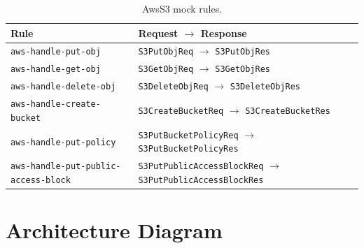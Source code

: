 \documentclass[11pt]{article}
\begin{document}
\begin{table}[H]
\centering
\small
\begin{tabular}{@{}ll@{}}
\toprule
\textbf{Rule} & \textbf{Request $\to$ Response} \\
\midrule
\texttt{aws-handle-put-obj}                & \texttt{S3PutObjReq} $\to$ \texttt{S3PutObjRes} \\
\texttt{aws-handle-get-obj}                & \texttt{S3GetObjReq} $\to$ \texttt{S3GetObjRes} \\
\texttt{aws-handle-delete-obj}             & \texttt{S3DeleteObjReq} $\to$ \texttt{S3DeleteObjRes} \\
\texttt{aws-handle-create-bucket}          & \texttt{S3CreateBucketReq} $\to$ \texttt{S3CreateBucketRes} \\
\texttt{aws-handle-put-policy}             & \texttt{S3PutBucketPolicyReq} $\to$ \texttt{S3PutBucketPolicyRes} \\
\texttt{aws-handle-put-public-access-block}& \texttt{S3PutPublicAccessBlockReq} $\to$ \texttt{S3PutPublicAccessBlockRes} \\
\bottomrule
\end{tabular}
\caption{AwsS3 mock rules.}
\end{table}

\section{Architecture Diagram}\label{sec:diagram}
\end{document}
